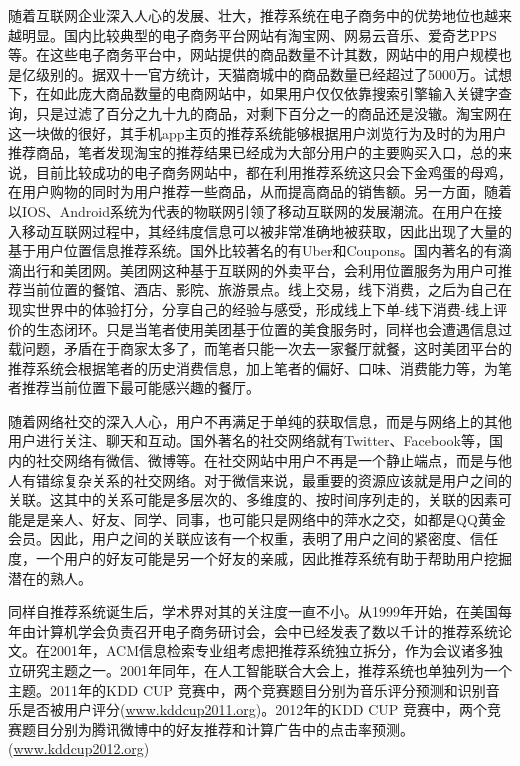 	随着互联网企业深入人心的发展、壮大，推荐系统在电子商务中的优势地位也越来越明显。国内比较典型的电子商务平台网站有淘宝网、网易云音乐、爱奇艺PPS等。在这些电子商务平台中，网站提供的商品数量不计其数，网站中的用户规模也是亿级别的。据双十一官方统计，天猫商城中的商品数量已经超过了5000万。试想下，在如此庞大商品数量的电商网站中，如果用户仅仅依靠搜索引擎输入关键字查询，只是过滤了百分之九十九的商品，对剩下百分之一的商品还是没辙。淘宝网在这一块做的很好，其手机app主页的推荐系统能够根据用户浏览行为\citep{user-interest}及时的为用户推荐商品，笔者发现淘宝的推荐结果已经成为大部分用户的主要购买入口，总的来说，目前比较成功的电子商务网站中，都在利用推荐系统这只会下金鸡蛋的母鸡，在用户购物的同时为用户推荐一些商品，从而提高商品的销售额。另一方面，随着以IOS、Android系统为代表的物联网引领了移动互联网的发展潮流。在用户在接入移动互联网过程中，其经纬度信息可以被非常准确地被获取，因此出现了大量的基于用户位置信息推荐系统。国外比较著名的有Uber和Coupons。国内著名的有滴滴出行和美团网。美团网这种基于互联网的外卖平台，会利用位置服务为用户可推荐当前位置的餐馆、酒店、影院、旅游景点。线上交易，线下消费，之后为自己在现实世界中的体验打分，分享自己的经验与感受，形成线上下单-线下消费-线上评价的生态闭环。只是当笔者使用美团基于位置的美食服务时，同样也会遭遇信息过载问题，矛盾在于商家太多了，而笔者只能一次去一家餐厅就餐，这时美团平台的推荐系统会根据笔者的历史消费信息，加上笔者的偏好、口味、消费能力等，为笔者推荐当前位置下最可能感兴趣的餐厅。

	随着网络社交的深入人心，用户不再满足于单纯的获取信息，而是与网络上的其他用户进行关注、聊天和互动。国外著名的社交网络就有Twitter、Facebook等，国内的社交网络有微信、微博等。在社交网站中用户不再是一个静止端点，而是与他人有错综复杂关系的社交网络。对于微信来说，最重要的资源应该就是用户之间的关联。这其中的关系可能是多层次的、多维度的、按时间序列走的，关联的因素可能是是亲人、好友、同学、同事，也可能只是网络中的萍水之交，如都是QQ黄金会员。因此，用户之间的关联应该有一个权重，表明了用户之间的紧密度、信任度，一个用户的好友可能是另一个好友的亲戚，因此推荐系统有助于帮助用户挖掘潜在的熟人。

	同样自推荐系统诞生后，学术界对其的关注度一直不小。从1999年开始，在美国每年由计算机学会负责召开电子商务研讨会，会中已经发表了数以千计的推荐系统论文。在2001年，ACM信息检索专业组考虑把推荐系统独立拆分，作为会议诸多独立研究主题之一。2001年同年，在人工智能联合大会上，推荐系统也单独列为一个主题。2011年的KDD CUP 竞赛中，两个竞赛题目分别为音乐评分预测和识别音乐是否被用户评分(\href{http://www.kdd.org/kdd2011/kddcup.shtml}{www.kddcup2011.org})。2012年的KDD CUP 竞赛中，两个竞赛题目分别为腾讯微博中的好友推荐和计算广告中的点击率预测。(\href{www.kddcup2012.org}{www.kddcup2012.org})

